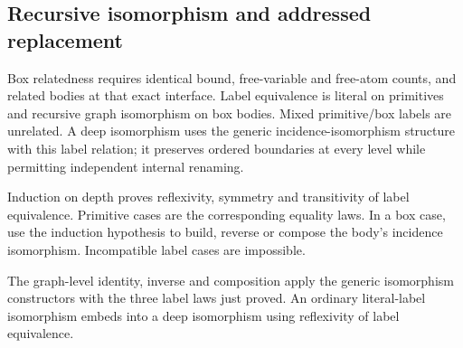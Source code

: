 


\subsection{Recursive isomorphism and addressed replacement}

Box relatedness requires identical bound, free-variable and free-atom counts,
and related bodies at that exact interface. Label equivalence is literal on
primitives and recursive graph isomorphism on box bodies. Mixed primitive/box
labels are unrelated. A deep isomorphism uses the generic incidence-isomorphism
structure with this label relation; it preserves ordered boundaries at every
level while permitting independent internal renaming.




Induction on depth proves reflexivity, symmetry and transitivity of label
equivalence. Primitive cases are the corresponding equality laws. In a box
case, use the induction hypothesis to build, reverse or compose the body's
incidence isomorphism. Incompatible label cases are impossible.




The graph-level identity, inverse and composition apply the generic
isomorphism constructors with the three label laws just proved. An ordinary
literal-label isomorphism embeds into a deep isomorphism using reflexivity
of label equivalence.




